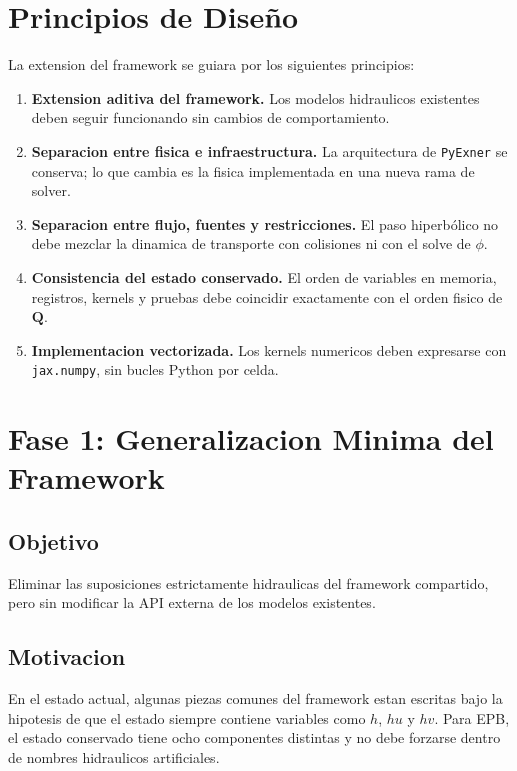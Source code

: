 \documentclass[11pt]{article}
\begin{document}
\section{Principios de Diseño}

La extension del framework se guiara por los siguientes principios:

\begin{enumerate}[label=\arabic*.]
    \item \textbf{Extension aditiva del framework.} Los modelos hidraulicos existentes deben seguir funcionando sin cambios de comportamiento.
    \item \textbf{Separacion entre fisica e infraestructura.} La arquitectura de \texttt{PyExner} se conserva; lo que cambia es la fisica implementada en una nueva rama de solver.
    \item \textbf{Separacion entre flujo, fuentes y restricciones.} El paso hiperb\'olico no debe mezclar la dinamica de transporte con colisiones ni con el solve de $\phi$.
    \item \textbf{Consistencia del estado conservado.} El orden de variables en memoria, registros, kernels y pruebas debe coincidir exactamente con el orden fisico de $\mathbf{Q}$.
    \item \textbf{Implementacion vectorizada.} Los kernels numericos deben expresarse con \texttt{jax.numpy}, sin bucles Python por celda.
\end{enumerate}

\section{Fase 1: Generalizacion Minima del Framework}

\subsection*{Objetivo}

Eliminar las suposiciones estrictamente hidraulicas del framework compartido, pero sin modificar la API externa de los modelos existentes.

\subsection*{Motivacion}

En el estado actual, algunas piezas comunes del framework estan escritas bajo la hipotesis de que el estado siempre contiene variables como $h$, $hu$ y $hv$. Para EPB, el estado conservado tiene ocho componentes distintas y no debe forzarse dentro de nombres hidraulicos artificiales.
\end{document}
